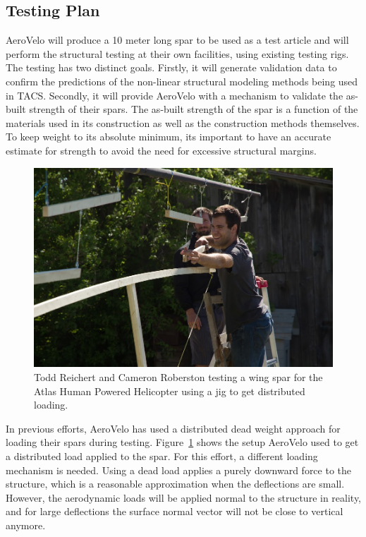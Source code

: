 \documentclass[]{aiaa-tc}
\begin{document}
        \subsection{Testing Plan}

        AeroVelo will produce a 10 meter long spar to be used as a test article and will perform the structural testing 
        at their own facilities, using existing testing rigs. The testing has 
        two distinct goals. Firstly, it will generate validation data to confirm the predictions 
        of the non-linear structural modeling methods being used in TACS. Secondly, it will provide AeroVelo with a mechanism 
        to validate the as-built strength of their spars. The as-built strength of the spar is a function of the materials used 
        in its construction as well as the construction methods themselves. To keep weight to its absolute minimum, 
        its important to have an accurate estimate for strength to avoid the need for excessive structural margins. 

        \begin{figure}
            \centering
            \includegraphics[width=.5\textwidth]{images/structural_test}
            \caption{Todd Reichert and Cameron Roberston testing a wing spar for the Atlas Human Powered Helicopter using a
            jig to get distributed loading. }
            \label{fig:spar-load-test}
        \end{figure}

        In previous efforts, AeroVelo has used a distributed dead weight approach for loading their spars during testing. 
        Figure~\ref{fig:spar-load-test} shows the setup AeroVelo used to get a distributed load applied to the spar. 
        For this effort, a different loading mechanism is needed. Using a dead load applies a purely downward force to the 
        structure, which is a reasonable approximation when the deflections are small. However, the aerodynamic loads will 
        be applied normal to the structure in reality, and for large deflections the surface normal vector will not be 
        close to vertical anymore. 
\end{document}
